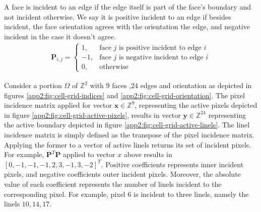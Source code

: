 A face is incident to an edge if the edge itself is part of the face's boundary and not incident otherwise. We say it is positive incident to an edge if besides incident, the face orientation  agrees with the orientation the edge, and negative incident in the case it doesn't agree.
\begin{align*}
\mathbf{P} _{i,j} = \left\{ \begin{array}{ll}
	1, & \text{face $j$ is positive incident to edge $i$}\\
	-1, & \text{face $j$ is negative incident to edge $i$}\\	
	0, & \text{otherwise}
\end{array}\right.
\end{align*}
%
\begin{example}
	Consider a portion $\Omega$ of $\mathbb{Z}^2$ with $9$ faces ,$24$ edges and orientation as depicted in figures \ref{app2:fig:cell-grid-indices} and \ref{app2:fig:cell-grid-orientation}. 	
	The pixel incidence matrix applied for vector $\mathbf{x} \in \mathbb{Z}^9$, representing the active pixels depicted in figure \ref{app2:fig:cell-grid-active-pixels}, results in vector $\mathbf{y} \in \mathbb{Z}^{24}$ representing the active boundary depicted in figure \ref{app2:fig:cell-grid-active-linels}.
	The linel incidence matrix is simply defined as the transpose of the pixel incidence matrix. Applying the former to a vector of active linels returns its set of incident pixels. For example, $\mathbf{P}^{T}\mathbf{P}$ applied to vector $x$ above results in $[0,-1,-1,-1,2,3,-1,3,-2]^T$. Positive coefficients represents inner incident pixels, and negative coefficients outer incident pixels. Moreover, the absolute value of each coefficient represents the number of linels incident to the corresponding pixel. For example, pixel $6$ is incident to three linels, namely the linels $10,14,17$.

\end{example}

